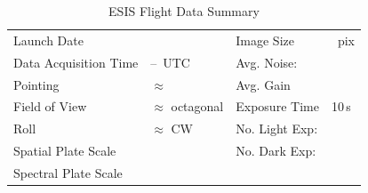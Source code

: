 		\begin{table}
		\begin{center}
			\caption{ESIS Flight Data Summary}
			\label{tab:data_info}
			\begin{tabular}{ll|ll}\hline
				Launch Date & \dateMission & Image Size  & \imageShape~pix\\
				Data Acquisition Time & \timeDataStart--\timeDataStop~UTC & Avg. Noise: & \readoutNoise\tablenotemark{a}\\ 
			    Pointing   &  $\approx$ \esispointing & Avg. Gain &   \gain \\
				Field of View  & $\approx$ \esisfov octagonal  & Exposure Time & 10\,s \\
				Roll & $\approx$ \esisroll CW & No. Light Exp: &\numDataFrames\\
			    Spatial  Plate Scale  &  \plateScale & No. Dark Exp: &\numDarkFrames \\
				Spectral  Plate Scale  &  \dispersion & \\
					\hline
			\end{tabular}
		\end{center}
		\end{table}
		
		



	
